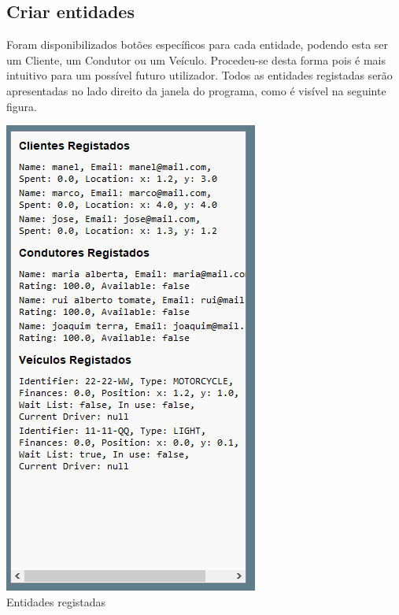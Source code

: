 \documentclass[a4paper]{article}
\begin{document}
\label{sec:manual}

\subsection{Criar entidades}
Foram disponibilizados botões específicos para cada entidade, podendo esta ser um Cliente, um Condutor ou um Veículo. Procedeu-se desta forma pois é mais intuitivo para um possível futuro utilizador. Todos as entidades registadas serão apresentadas no lado direito da janela do programa, como é visível na seguinte figura.
\begin{center}
  \includegraphics[scale=0.70]{janela_registados}\\
  \caption{Entidades registadas}
  \label{fig:picture}
\end{center}
\end{document}
